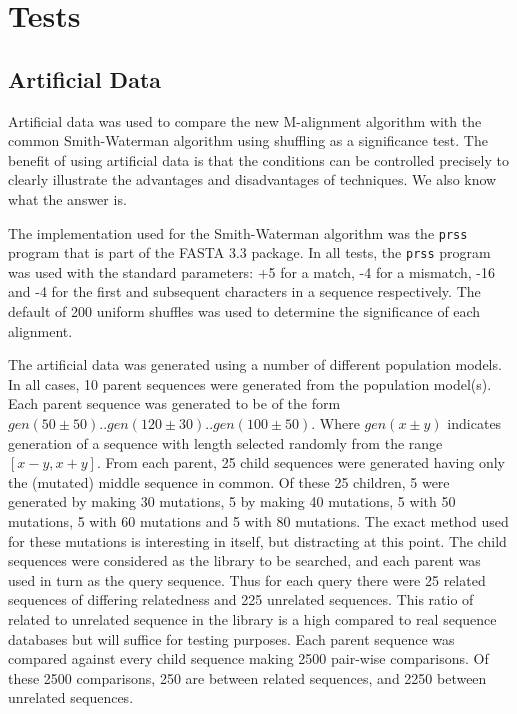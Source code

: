 \documentclass[a4paper,11pt,oneside]{article}
\begin{document}
\section{Tests}

\subsection{Artificial Data}

Artificial data was used to compare the new M-alignment algorithm with the
common Smith-Waterman algorithm using shuffling as a significance test.  The
benefit of using artificial data is that the conditions can be controlled
precisely to clearly illustrate the advantages and disadvantages of
techniques.
We also know what the answer is.

The implementation used for the Smith-Waterman algorithm was the \verb!prss!
program that is part of the FASTA 3.3 package.  In all tests, the \verb!prss!
program was used with the standard parameters: +5 for a match, -4 for a
mismatch, -16 and -4 for the first and subsequent characters in a sequence
respectively.  The default of 200 uniform shuffles was used to determine the
significance of each alignment.

The artificial data was generated using a number of different population
models.  In all cases, 10 parent sequences were generated from the population
model(s).  Each parent sequence was generated to be of the form $gen(50\pm50)
.. gen(120\pm30) .. gen(100\pm50)$.  Where $gen(x\pm y)$ indicates generation
of a sequence with length selected randomly from the range $[x-y, x+y]$.  From
each parent, 25 child sequences were generated having only the (mutated)
middle sequence in common.  Of these 25 children, 5 were generated by making
30 mutations, 5 by making 40 mutations, 5 with 50 mutations, 5 with 60
mutations and 5 with 80 mutations.  The exact method used for these mutations
is interesting in itself, but distracting at this point.
The child sequences were
considered as the library to be searched, and each parent was used in turn as
the query sequence.  Thus for each query there were 25 related sequences of
differing relatedness and 225 unrelated sequences.  This ratio of related to
unrelated sequence in the library is a high compared to real sequence
databases but will suffice for testing purposes.  Each parent sequence was
compared against every child sequence making 2500 pair-wise comparisons.  Of
these 2500 comparisons, 250 are between related sequences, and 2250 between
unrelated sequences.
\end{document}
